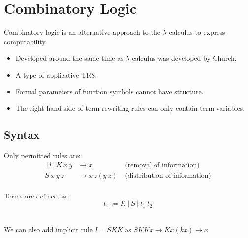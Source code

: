 \section{Combinatory Logic}
Combinatory logic is an alternative approach to the $\lambda$-calculus to express computability.
\begin{itemize}
    \item Developed around the same time as $\lambda$-calculus was developed by Church.
    \item A type of applicative TRS.
    \item Formal parameters of function symbols cannot have structure.
    \item The right hand side of term rewriting rules can only contain term-variables.
\end{itemize}
\subsection{Syntax}
\begin{minipage}[t]{.6\textwidth}
    Only permitted rules are:
    \[\begin{matrix*}[l]
        K \ x \ y &\to x  & \text{ (removal of information)}\\
        S \ x \ y \ z &\to x \ z (y \ z) & \text{ (distribution of information)}\\
    \end{matrix*}\]
\end{minipage}
\begin{minipage}[t]{.4\textwidth}
    Terms are defined as:
    \[t ::= K \ | \ S \ | \ t_1 \ t_2 \]
\end{minipage}
\vspace{2mm}
\\ We can also add implicit rule $I = SKK$ as $SKKx \to Kx(kx) \to x$

